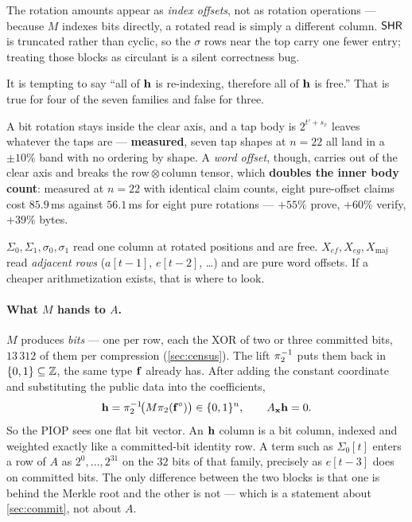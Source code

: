 The rotation amounts appear as \emph{index offsets}, not as rotation
operations --- because $M$ indexes bits directly, a rotated read is simply a
different column. $\mathsf{SHR}$ is truncated rather than cyclic, so the $\sigma$ rows
near the top carry one fewer entry; treating those blocks as circulant is a
silent correctness bug.

\begin{warning}
\label{warn:offsets}
It is tempting to say ``all of $\mathbf{h}$ is re-indexing, therefore all of $\mathbf{h}$ is
free.'' That is true for four of the seven families and false for three.

A bit rotation stays inside the clear axis, and a tap body is $2^{t'+s_x}$
leaves whatever the taps are --- \textbf{measured}, seven tap shapes at $n{=}22$
all land in a $\pm10\%$ band with no ordering by shape. A \emph{word offset},
though, carries out of the clear axis and breaks the row\,$\otimes$\,column
tensor, which \textbf{doubles the inner body count}: measured at $n{=}22$ with
identical claim counts, eight pure-offset claims cost $85.9$\,ms against
$56.1$\,ms for eight pure rotations --- $+55\%$ prove, $+60\%$ verify, $+39\%$
bytes.

$\Sigma_0,\Sigma_1,\sigma_0,\sigma_1$ read one column at rotated positions and
are free. $X_{ef},X_{eg},X_{\mathrm{maj}}$ read \emph{adjacent rows}
($a[t{-}1]$, $e[t{-}2]$, \dots) and are pure word offsets. If a cheaper
arithmetization exists, that is where to look.
\end{warning}

\paragraph{What $M$ hands to $A$.} $M$ produces \emph{bits} --- one per row,
each the XOR of two or three committed bits, $13\,312$ of them per compression
(\cref{sec:census}). The lift $\pi_2^{-1}$ puts them back in
$\{0,1\}\subseteq\mathbb{Z}$, the same type $\mathbf{f}$ already has.  After adding the
constant coordinate and substituting the public data into the coefficients,
\[
  \mathbf{h}=\pi_2^{-1}\!\bigl(M\pi_2(\mathbf{f}^{\circ})\bigr)\in\{0,1\}^n,
  \qquad A_{\mathbf{x}}\mathbf{h}=0.
\]
So the PIOP sees one flat bit vector.  An $\mathbf{h}$
column is a bit column, indexed and weighted exactly like a committed-bit
identity row. A
term such as $\Sigma_0[t]$ enters a row of $A$ as $2^0,\dots,2^{31}$ on the $32$
bits of that family, precisely as $e[t{-}3]$ does on committed bits. The only
difference between the two blocks is that one is behind the Merkle root and the
other is not --- which is a statement about \cref{sec:commit}, not about $A$.

